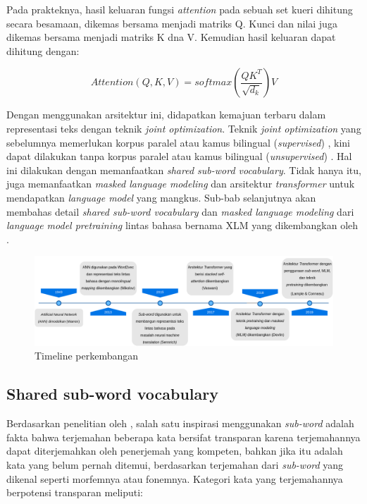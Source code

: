 \documentclass[conference]{IEEEtran}
\begin{document}
	Pada prakteknya, hasil keluaran fungsi \textit{attention} pada sebuah set kueri dihitung secara besamaan, dikemas bersama menjadi matriks Q. Kunci dan nilai juga dikemas bersama menjadi matriks K dna V. Kemudian hasil keluaran dapat dihitung dengan:

	\begin{equation}
	    Attention(Q,K,V) = softmax(\frac{QK^{T}}{\sqrt{d_k}})V
	\end{equation}

	Dengan menggunakan arsitektur ini, didapatkan kemajuan terbaru dalam representasi teks dengan teknik \textit{joint optimization}. Teknik \textit{joint optimization} yang sebelumnya memerlukan korpus paralel atau kamus bilingual (\textit{supervised}) \cite{b13}, kini dapat dilakukan tanpa korpus paralel atau kamus bilingual (\textit{unsupervised}) \cite{b2}. Hal ini dilakukan dengan memanfaatkan \textit{shared sub-word vocabulary}. Tidak hanya itu, \cite{b2} juga memanfaatkan \textit{masked language modeling} dan arsitektur \textit{transformer} untuk mendapatkan \textit{language model} yang mangkus. Sub-bab selanjutnya akan membahas detail \textit{shared sub-word vocabulary} dan \textit{masked language modeling} dari \textit{language model pretraining} lintas bahasa bernama XLM yang dikembangkan oleh \cite{b2}.

\begin{figure}[!htb]
    \centerline{
    \includegraphics[width=1\textwidth]{resources/timeline.png}}
    \caption{Timeline perkembangan}
    \label{fig:timeline}
\end{figure}

	\subsection{Shared sub-word vocabulary}
	Berdasarkan penelitian oleh \cite{b16}, salah satu inspirasi menggunakan \textit{sub-word} adalah fakta bahwa terjemahan beberapa kata bersifat transparan karena terjemahannya dapat diterjemahkan oleh penerjemah yang kompeten, bahkan jika itu adalah kata yang belum pernah ditemui, berdasarkan terjemahan dari \textit{sub-word} yang dikenal seperti morfemnya atau fonemnya. Kategori kata yang terjemahannya berpotensi transparan meliputi:
\end{document}
